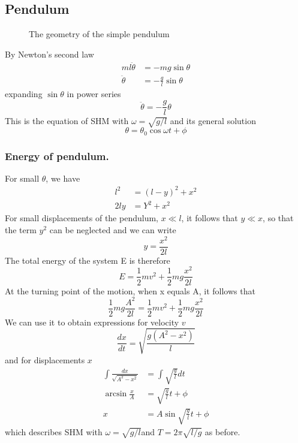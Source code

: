 \documentclass[../../main.tex]{subfiles}
\begin{document}
\subsection{Pendulum}
\begin{figure}[b]
    \centering
    \caption*{The geometry of the simple pendulum}
\end{figure}
By Newton's second law 
\begin{align*}
    ml\ddot{\theta}&=-mg\sin\theta\\
\ddot{\theta}&=-\frac{g}{l}\sin \theta
\end{align*}
expanding $\sin\theta $ in power series
\begin{equation*}
    \ddot{\theta}=-\frac{g}{l}\theta
\end{equation*}
This is the equation of SHM with $ \omega=\sqrt{g/ l}$ and its general solution 
\begin{equation*}
    \theta=\theta_0 \cos \omega t +\phi
\end{equation*}

\subsubsection{Energy of pendulum.} For small $\theta$, we have
\begin{align*}
    l^2& = (l - y)^2 + x^2\\
    2ly&=Y^2+x^2
\end{align*}
For small displacements of the pendulum, $x\ll l $, it follows that $ y \ll x$, so that the term $y^2$ can be neglected and we can write
\begin{equation*}
    y=\frac{x^2}{2l}
\end{equation*}
The total energy of the system E is therefore\begin{equation*}
    E=\frac{1}{2}mv^2+\frac{1}{2}mg\frac{x^2}{2l}
\end{equation*}
At the turning point of the motion, when x equals A, it follows that
\begin{equation*}
    \frac{1}{2}mg\frac{A^2}{2l}=\frac{1}{2}mv^2+\frac{1}{2}mg\frac{x^2}{2l}
\end{equation*}
We can use it to obtain expressions for velocity $v$ 
\begin{equation*}
    \frac{dx}{dt}=\sqrt{\frac{g(A^2-x^2)}{l}}
\end{equation*}
and for displacements $x$
\begin{align*}
    \int \frac{dx}{\sqrt{A^2-x^2}}&=\int \sqrt{\frac{g}{l}}dt\\
    \arcsin \frac{x}{A}&= \sqrt{\frac{g}{l}}t+\phi\\
    x&=A\sin \sqrt{\frac{g}{l}}t+\phi
\end{align*}
which describes SHM with $\omega = \sqrt{g/ l} $and $T = 2\pi \sqrt{l/g}$ as before.
\end{document}

